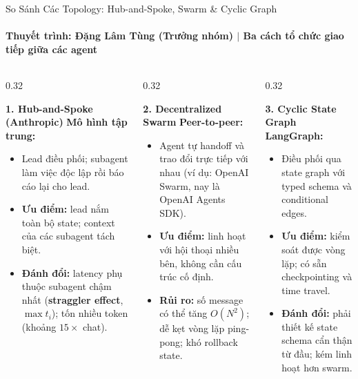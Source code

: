 \documentclass[aspectratio=1610,10pt,xcolor={table}]{beamer}
\begin{document}
\begin{frame}{So Sánh Các Topology: Hub-and-Spoke, Swarm \& Cyclic Graph}
  \framesubtitle{Thuyết trình: Đặng Lâm Tùng (Trưởng nhóm) $\vert$ Ba cách tổ chức giao tiếp giữa các agent}

  \begin{columns}[t]
    \begin{column}{0.32\textwidth}
      \begin{block}{\textbf{1. Hub-and-Spoke (Anthropic)}}
        \footnotesize
        \textbf{Mô hình tập trung:}
        \begin{itemize}\scriptsize
          \item Lead điều phối; subagent làm việc độc lập rồi báo cáo lại cho lead.
          \item \textbf{Ưu điểm:} lead nắm toàn bộ state; context của các subagent tách biệt.
          \item \textbf{Đánh đổi:} latency phụ thuộc subagent chậm nhất (\textbf{straggler effect}, $\max t_i$); tốn nhiều token (khoảng $15\times$ chat).
        \end{itemize}
      \end{block}
    \end{column}

    \begin{column}{0.32\textwidth}
      \begin{alertblock}{\textbf{2. Decentralized Swarm}}
        \footnotesize
        \textbf{Peer-to-peer:}
        \begin{itemize}\scriptsize
          \item Agent tự handoff và trao đổi trực tiếp với nhau (ví dụ: OpenAI Swarm, nay là OpenAI Agents SDK).
          \item \textbf{Ưu điểm:} linh hoạt với hội thoại nhiều bên, không cần cấu trúc cố định.
          \item \textbf{Rủi ro:} số message có thể tăng $O(N^2)$; dễ kẹt vòng lặp ping-pong; khó rollback state.
        \end{itemize}
      \end{alertblock}
    \end{column}

    \begin{column}{0.32\textwidth}
      \begin{block}{\textbf{3. Cyclic State Graph}}
        \footnotesize
        \textbf{LangGraph:}
        \begin{itemize}\scriptsize
          \item Điều phối qua state graph với typed schema và conditional edges.
          \item \textbf{Ưu điểm:} kiểm soát được vòng lặp; có sẵn checkpointing và time travel.
          \item \textbf{Đánh đổi:} phải thiết kế state schema cẩn thận từ đầu; kém linh hoạt hơn swarm.
        \end{itemize}
      \end{block}
    \end{column}
  \end{columns}


\end{frame}
\end{document}
